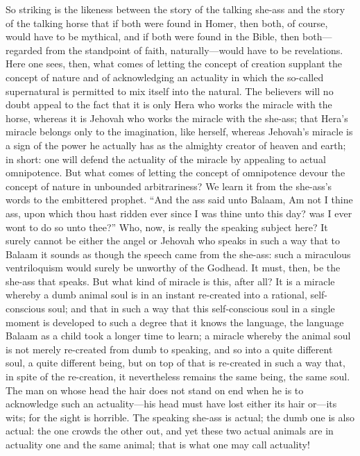 \documentclass[12pt]{book}
\newcommand{\opage}[1]{\marginnote{\footnotesize\textit{[#1]}}}
\begin{document}
So striking is the likeness between the story of the talking she-ass
and the story of the talking horse that if both were found in Homer,
then both, of course, would have to be mythical, and if both were found
in the Bible, then both---regarded from the standpoint of faith,
naturally---would have to be revelations. Here one sees, then, what
comes of letting the concept of creation supplant the concept of nature
and of acknowledging an actuality in which the so-called supernatural is
permitted to mix itself into the natural. The believers will no doubt
appeal to the fact that it is only Hera who works the miracle with the
horse, whereas it is Jehovah who works the miracle with the she-ass;
that Hera's miracle belongs only to the imagination, like herself,
whereas Jehovah's miracle is a sign of the power he actually has as the
almighty creator of heaven and earth; in short: one will defend the
actuality of the miracle by appealing to actual omnipotence. But what
comes of letting the concept of omnipotence devour the concept of
nature in unbounded arbitrariness? We learn it from the she-ass's words
to the embittered prophet. ``And the ass said unto Balaam, Am not I
thine ass, upon which thou hast ridden ever since I was thine unto this
day? was I ever
\opage{159}\setcounter{footnote}{0}%
wont to do so unto thee?'' Who, now, is really the speaking subject
here? It surely cannot be either the angel or Jehovah who speaks in
such a way that to Balaam it sounds as though the speech came from the
she-ass: such a miraculous ventriloquism would surely be unworthy of
the Godhead. It must, then, be the she-ass that speaks. But what kind of
miracle is this, after all? It is a miracle whereby a dumb animal soul
is in an instant re-created into a rational, self-conscious soul; and
that in such a way that this self-conscious soul in a single moment is
developed to such a degree that it knows the language, the language
Balaam as a child took a longer time to learn; a miracle whereby the
animal soul is not merely re-created from dumb to speaking, and so into
a quite different soul, a quite different being, but on top of that is
re-created in such a way that, in spite of the re-creation, it
nevertheless remains the same being, the same soul. The man on whose
head the hair does not stand on end when he is to acknowledge such an
actuality---his head must have lost either its hair or---its wits; for
the sight is horrible. The speaking she-ass is actual; the dumb one is
also actual: the one crowds the other out, and yet these two actual
animals are in actuality one and the same animal; that is what one may
call actuality!
\end{document}
